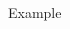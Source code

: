 \documentclass[11pt,compress,t,notes=noshow, aspectratio=169, xcolor=table]{beamer}
\begin{document}
\begin{frame}{Example}
\begin{columns}[c, totalwidth=\textwidth]
\begin{column}{0.63\textwidth}
\end{column}
\end{columns}

\end{frame}

\end{document}
